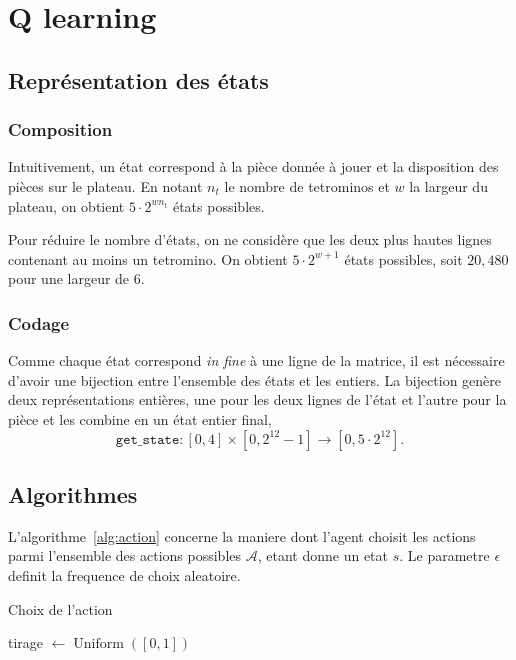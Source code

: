 \documentclass{article}
\DeclareMathOperator{\argmax}{argmax}
\DeclareMathOperator{\uniform}{Uniform}
\begin{document}
\section{Q learning}

\subsection{Représentation des états}
\subsubsection{Composition}
Intuitivement, un état correspond à la pièce donnée à jouer et la disposition
des pièces sur le plateau. En notant \(n_t\) le nombre de tetrominos et \(w\) la
largeur du plateau, on obtient \(5 \cdot 2^{wn_t}\) états possibles.

Pour réduire le nombre d'états, on ne considère que les deux plus hautes lignes
contenant au moins un tetromino. On obtient \(5\cdot 2^{w+1}\) états possibles,
soit \(20,480\) pour une largeur de 6.

\subsubsection{Codage}
Comme chaque état correspond \textit{in fine} à une ligne de la matrice, il est
nécessaire d'avoir une bijection entre l'ensemble des états et les entiers. La
bijection genère deux représentations entières, une pour les deux lignes de
l'état et l'autre pour la pièce et les combine en un état entier final,
\[
  \texttt{get\_state}\colon [0,4]\times [0, 2^{12} - 1] \to [0, 5\cdot 2^{12}].
\]


\subsection{Algorithmes}

L'algorithme~\ref{alg:action} concerne la maniere dont l'agent choisit les
actions parmi l'ensemble des actions possibles \(\mathcal{A}\), etant donne un
etat \(s\). Le parametre \(\epsilon\) definit la frequence de choix aleatoire.
\begin{algorithm}
  \caption{Choix de l'action}\label{alg:action}
  \begin{algorithmic}
    [1]
    \State{} tirage \(\gets \uniform([0, 1])\)
    \Return{\(\argmax_{a\in\mathcal{A}} Q(s, a)\)}
    \Else{}
    \Return{\(\uniform(\mathcal{A})\)}
    \EndIf{}
    \EndProcedure{}
  \end{algorithmic}
\end{algorithm}
\end{document}
